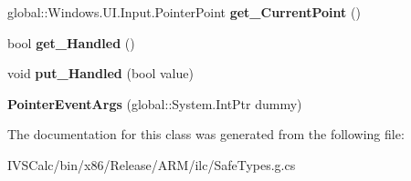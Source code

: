 \begin{DoxyCompactItemize}
\mbox{\label{class_windows_1_1_u_i_1_1_core_1_1_pointer_event_args_a60253996efe6aa23360bb39f0288c55b}} 
global\+::\+Windows.\+U\+I.\+Input.\+Pointer\+Point {\bfseries get\+\_\+\+Current\+Point} ()
\item 
\mbox{\label{class_windows_1_1_u_i_1_1_core_1_1_pointer_event_args_ae5099383c4d10dec571b026258afc87e}} 
bool {\bfseries get\+\_\+\+Handled} ()
\item 
\mbox{\label{class_windows_1_1_u_i_1_1_core_1_1_pointer_event_args_ae122ac0156bd8ce343b58330f9715614}} 
void {\bfseries put\+\_\+\+Handled} (bool value)
\item 
\mbox{\label{class_windows_1_1_u_i_1_1_core_1_1_pointer_event_args_a47975f7ef4543d7e006ef3d76a69e42d}} 
{\bfseries Pointer\+Event\+Args} (global\+::\+System.\+Int\+Ptr dummy)
\end{DoxyCompactItemize}


The documentation for this class was generated from the following file\+:\begin{DoxyCompactItemize}
\item 
I\+V\+S\+Calc/bin/x86/\+Release/\+A\+R\+M/ilc/Safe\+Types.\+g.\+cs\end{DoxyCompactItemize}

